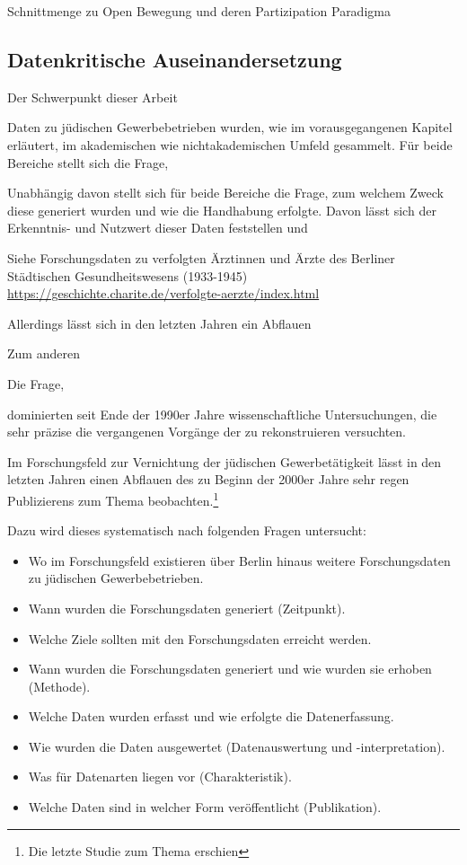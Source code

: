 Schnittmenge zu Open Bewegung und deren Partizipation Paradigma



\subsection{Datenkritische Auseinandersetzung}

Der Schwerpunkt dieser Arbeit


Daten zu jüdischen Gewerbebetrieben wurden, wie im vorausgegangenen Kapitel erläutert, im akademischen wie nichtakademischen Umfeld gesammelt. Für beide Bereiche stellt sich die Frage, 

Unabhängig davon stellt sich für beide Bereiche die Frage, zum welchem Zweck diese generiert wurden und wie die Handhabung erfolgte. Davon lässt sich der Erkenntnis- und Nutzwert dieser Daten feststellen und 


Siehe Forschungsdaten zu verfolgten Ärztinnen und Ärzte des Berliner Städtischen Gesundheitswesens (1933-1945)
\url{https://geschichte.charite.de/verfolgte-aerzte/index.html}


Allerdings lässt sich in den letzten Jahren ein Abflauen

Zum anderen

Die Frage, 

 dominierten seit Ende der 1990er Jahre wissenschaftliche Untersuchungen, die sehr präzise die vergangenen Vorgänge der zu rekonstruieren versuchten.      


Im Forschungsfeld zur Vernichtung der jüdischen Gewerbetätigkeit lässt in den letzten Jahren einen Abflauen des zu Beginn der 2000er Jahre sehr regen Publizierens zum Thema beobachten.\footnote{Die letzte Studie zum Thema erschien}


Dazu wird dieses systematisch nach folgenden Fragen untersucht:

\begin{itemize}
\item Wo im Forschungsfeld existieren über Berlin hinaus weitere Forschungsdaten zu jüdischen Gewerbebetrieben.
\item Wann wurden die Forschungsdaten generiert (Zeitpunkt).
\item Welche Ziele sollten mit den Forschungsdaten erreicht werden.
\item Wann wurden die Forschungsdaten generiert und wie wurden sie erhoben (Methode). 
\item Welche Daten wurden erfasst und wie erfolgte die Datenerfassung.
\item Wie wurden die Daten ausgewertet (Datenauswertung und -interpretation).
\item Was für Datenarten liegen vor (Charakteristik).
\item Welche Daten sind in welcher Form veröffentlicht (Publikation).
\end{itemize}


